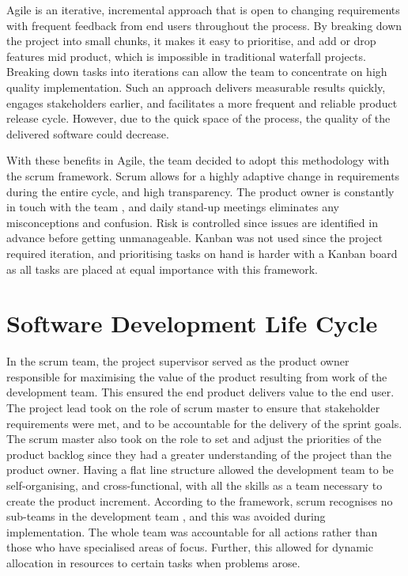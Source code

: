 Agile is an iterative, incremental approach that is open to changing requirements with frequent feedback from end users throughout the process. By breaking down the project into small chunks, it makes it easy to prioritise, and add or drop features mid product, which is impossible in traditional waterfall projects. Breaking down tasks into iterations can allow the team to concentrate on high quality implementation. Such an approach delivers measurable results quickly, engages stakeholders earlier, and facilitates a more frequent and reliable product release cycle. However, due to the quick space of the process, the quality of the delivered software could decrease.

With these benefits in Agile, the team decided to adopt this methodology with the scrum framework. Scrum allows for a highly adaptive change in requirements during the entire cycle, and high transparency. The product owner is constantly in touch with the team \cite{globalluxsoft}, and daily stand-up meetings eliminates any misconceptions and confusion. Risk is controlled since issues are identified in advance before getting unmanageable. Kanban was not used since the project required iteration, and prioritising tasks on hand is harder with a Kanban board as all tasks are placed at equal importance with this framework.

\section{Software Development Life Cycle}
In the scrum team, the project supervisor served as the product owner responsible for maximising the value of the product resulting from work of the development team. This ensured the end product delivers value to the end user. The project lead took on the role of scrum master to ensure that stakeholder requirements were met, and to be accountable for the delivery of the sprint goals. The scrum master also took on the role to set and adjust the priorities of the product backlog since they had a greater understanding of the project than the product owner. Having a flat line structure allowed the development team to be self-organising, and cross-functional, with all the skills as a team necessary to create the product increment. According to the framework, scrum recognises no sub-teams in the development team \cite{schwaber}, and this was avoided during implementation. The whole team was accountable for all actions rather than those who have specialised areas of focus. Further, this allowed for dynamic allocation in resources to certain tasks when problems arose.

